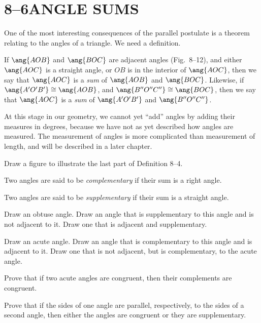 \documentclass[11pt]{book}
\theoremstyle{bkplain}
\theoremstyle{XIplainnote}
\theoremstyle{bkplain}
\theoremstyle{bkplain}
\begin{document}
\section*{8--6\quad ANGLE SUMS}

One of the most interesting consequences of the parallel postulate is a
theorem relating to the angles of a triangle. We need a definition.

\begin{definition}
If $\ang{AOB}$ and $\ang{BOC}$ are adjacent angles (Fig.~8--12), and either
$\ang{AOC}$ is a straight angle, or $OB$ is in the interior of $\ang{AOC}$,
then we say that $\ang{AOC}$ is a \emph{sum} of $\ang{AOB}$ and $\ang{BOC}$.
Likewise, if $\ang{A'O'B'} \cong \ang{AOB}$, and
$\ang{B''O''C''} \cong \ang{BOC}$, then we say that $\ang{AOC}$ is a
\emph{sum} of $\ang{A'O'B'}$ and $\ang{B''O''C''}$.
\end{definition}

\FIGVIIITWELVE

\begin{remark}
At this stage in our geometry, we cannot yet ``add'' angles by adding their
measures in degrees, because we have not as yet described how angles are
measured. The measurement of angles is more complicated than measurement of
length, and will be described in a later chapter.
\end{remark}

Draw a figure to illustrate the last part of Definition 8--4.

\begin{definition}
Two angles are said to be \emph{complementary} if their sum is a right angle.
\end{definition}

\begin{definition}
Two angles are said to be \emph{supplementary} if their sum is a straight
angle.
\end{definition}

\begin{exercisecols}
\begin{exlist}
\item Draw an obtuse angle. Draw an angle that is supplementary to this angle
  and is not adjacent to it. Draw one that is adjacent and supplementary.
\item Draw an acute angle. Draw an angle that is complementary to this angle
  and is adjacent to it. Draw one that is not adjacent, but is complementary,
  to the acute angle.
\item Prove that if two acute angles are congruent, then their complements are
  congruent.
\item Prove that if the sides of one angle are parallel, respectively, to the
  sides of a second angle, then either the angles are congruent or they are
  supplementary.
\end{exlist}
\end{exercisecols}
\end{document}
